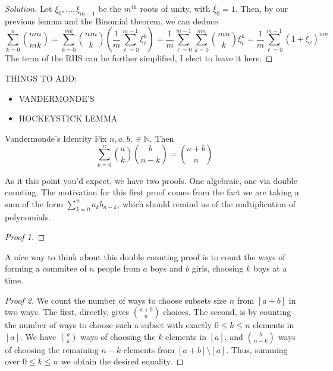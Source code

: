 \documentclass{article}
\begin{document}
\begin{proof}[Solution]
    Let $\xi_0, \dots, \xi_{m-1}$ be the $m^\text{th}$ roots of unity, with $\xi_0 = 1$. Then, by our previous lemma and the Binomial theorem,
    we can deduce 
    \[\sum_{k=0}^{n}\binom{mn}{mk} = \sum_{k=0}^{mk}\binom{nm}{k}\left(\frac{1}{m}\sum_{\ell = 0}^{m-1}\xi_\ell^k\right) 
    = \frac{1}{m}\sum_{\ell = 0}^{m-1} \sum_{k=0}^{mn} \binom{mn}{k}\xi_i^k = \frac{1}{m}\sum_{\ell = 0}^{m-1} (1+\xi_\ell)^{mn}\]
    The term of the RHS can be further simplified, I elect to leave it here. 
\end{proof}

THINGS TO ADD:
\begin{itemize}
\item VANDERMONDE'S
\item HOCKEYSTICK LEMMA 
\end{itemize}

\begin{proposition}[]{Vandermonde's Identity}
    Fix $n, a, b, \in \mathbb{N}$. Then 
    \[\sum_{k=0}^n \binom{a}{k}\binom{b}{n-k} = \binom{a + b}{n}\]
\end{proposition}

As it this point you'd expect, we have two proofs. One algebraic, one via double counting. The motivation for this 
first proof comes from the fact we are taking a sum of the form $\sum_{k=0}^n a_kb_{n-k}$, which should remind us 
of the multiplication of polynomials. 

\begin{proof}[Proof 1]

\end{proof}

A nice way to think about this double counting proof is to count the ways of forming a commitee of $n$ people from 
$a$ boys and $b$ girls, choosing $k$ boys at a time.

\begin{proof}[Proof 2]
    We count the number of ways to choose subsets size $n$ from $[a+b]$ in two ways. The first, directly, gives 
    $\binom{a+b}{n}$ choices. The second, is by counting the number of ways to choose such a subset with exactly 
    $0 \leq k \leq n$ elements in $[a]$. We have $\binom{a}{k}$ ways of choosing the $k$ elements in $[a]$, and 
    $\binom{b}{n-k}$ ways of choosing the remaining $n-k$ elements from $[a+b] \setminus [a]$. Thus, summing over 
    $0 \leq k \leq n$ we obtain the desired equality.
\end{proof}
\end{document}
